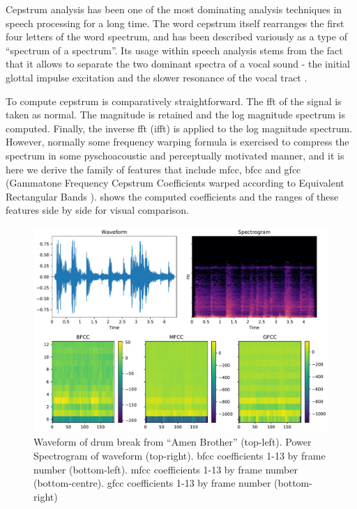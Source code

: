 {{Cepstrum analysis has been one of the most dominating analysis techniques in speech processing for a long time. The word cepstrum itself rearranges the first four letters of the word spectrum, and has been described variously as a type of ``spectrum of a spectrum''. Its usage within speech analysis stems from the fact that it allows to separate the two dominant spectra of a vocal sound - the initial glottal impulse excitation and the slower resonance of the vocal tract \citep{Roads1996, Kim2006}.

To compute cepstrum is comparatively straightforward. The \acrshort{fft} of the signal is taken as normal. The magnitude is retained and the log magnitude spectrum is computed. Finally, the inverse \acrshort{fft} (\acrshort{ifft}) is applied to the log magnitude spectrum. However, normally some frequency warping formula is exercised to compress the spectrum in some pyschoacoustic and perceptually motivated manner, and it is here we derive the family of features that include \acrfull{mfcc}, \acrfull{bfcc} and \acrshort{gfcc} (Gammatone Frequency Cepstrum Coefficients warped according to Equivalent Rectangular Bands \citep{Shao2009}).  shows the computed coefficients and the ranges of these features side by side for visual comparison.

\begin{figure}
	\begin{center}
		\includegraphics[scale=0.70]{ch05_pyconcat/figures/wave_spec_mfcc_bfcc.pdf}		
		\end{center}
		\caption[Waveform, spectrogram, BFCC, MFCC and GFCC impressions of the ``Amen Break'' drum solo from ``Amen Brother'']{Waveform of drum break from ``Amen Brother'' (top-left). Power Spectrogram of waveform (top-right). \acrshort{bfcc} coefficients 1-13 by frame number (bottom-left). \acrshort{mfcc} coefficients 1-13 by frame number (bottom-centre). \acrshort{gfcc} coefficients 1-13 by frame number (bottom-right)}
	\label{fig:bfcc_mfcc_gfcc_compared}
\end{figure}

}}
